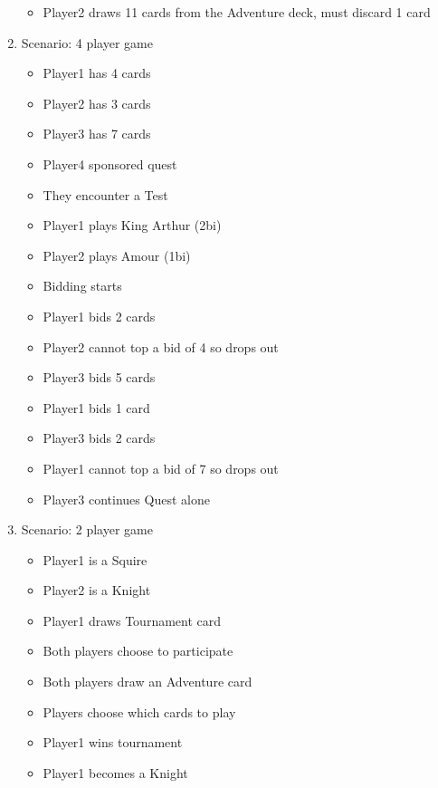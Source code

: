 \documentclass[11pt]{article}
\begin{document}
\begin{enumerate}
\begin{itemize}
	\item Player2 draws 11 cards from the Adventure deck, must discard 1 card
	\end{itemize}
\item Scenario: 4 player game
	\begin{itemize}
	\item Player1 has 4 cards
	\item Player2 has 3 cards
	\item Player3 has 7 cards
	\item Player4 sponsored quest
	\item They encounter a Test
	\item Player1 plays King Arthur (2bi)
	\item Player2 plays Amour (1bi)
	\item Bidding starts
	\item Player1 bids 2 cards
	\item Player2 cannot top a bid of 4 so drops out
	\item Player3 bids 5 cards
	\item Player1 bids 1 card
	\item Player3 bids 2 cards
	\item Player1 cannot top a bid of 7 so drops out
	\item Player3 continues Quest alone
	\end{itemize}

\item Scenario: 2 player game
	\begin{itemize}
	\item Player1 is a Squire
	\item Player2 is a Knight
	\item Player1 draws Tournament card
	\item Both players choose to participate
	\item Both players draw an Adventure card
	\item Players choose which cards to play
	\item Player1 wins tournament
	\item Player1 becomes a Knight
	\end{itemize}
\end{enumerate}
\end{document}
